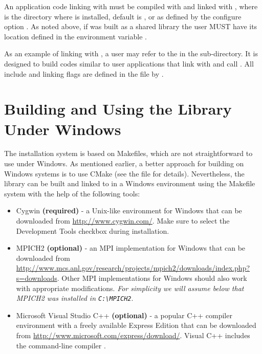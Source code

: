 An application code linking with \hypre{} must be compiled with
 and linked with , where
 is the directory where \hypre{} is installed, default is
, or as defined by the configure option . As
noted above, if \hypre{} was built as a shared library the user MUST have its
location defined in the environment variable .

As an example of linking with \hypre{}, a user may refer to the 
in the  sub-directory.  It is designed to build codes similar to
user applications that link with and call \hypre{}.  All include and linking
flags are defined in the  file by .


\section{Building and Using the Library Under Windows} \label{sec-windows}

The \hypre{} installation system is based on Makefiles, which are not
straightforward to use under Windows.  As mentioned earlier, a better approach
for building on Windows systems is to use CMake \cite{CMakeWebPage} (see the
 file for details).  Nevertheless, the library can be built and
linked to in a Windows environment using the Makefile system with the help of
the following tools:

\begin{itemize}
\item Cygwin {\bf (required)} - a Unix-like environment for Windows that can be
  downloaded from \url{http://www.cygwin.com/}.  Make sure to select the
  Development Tools checkbox during installation.
\item MPICH2 {\bf (optional)} - an MPI implementation for Windows that can be
  downloaded from
  \url{http://www.mcs.anl.gov/research/projects/mpich2/downloads/index.php?s=downloads}.
  Other MPI implementations for Windows should also work with appropriate
  modifications. {\em For simplicity we will assume below that MPICH2 was
  installed in \verb|C:\MPICH2|}.
\item Microsoft Visual Studio C++ {\bf (optional)} - a popular C++ compiler
  environment with a freely available Express Edition that can be downloaded
  from \url{http://www.microsoft.com/express/download/}. Visual C++ includes the
  command-line compiler .
\end{itemize}


